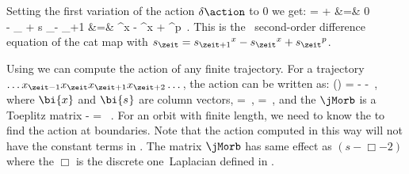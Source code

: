 Setting the first variation of the action $\delta \action$ to 0 we get:
\bea
\frac{\partial \action}{\partial \ssp_\zeit} =
 +  &=& 0 \\
\Rightarrow  - \ssp_{} + s \ssp_\zeit - \ssp_{\zeit+1}
&=& ^x - \Ssym{\zeit}^x + \Ssym{\zeit}^p
\,.
\label{ActVariantion}
\eea
This is the \PV\ second-order difference equation of the cat map with
$\Ssym{\zeit} = \Ssym{\zeit+1}^x - \Ssym{\zeit}^x + \Ssym{\zeit}^p$.

Using  we can compute the action of
any finite trajectory. For a trajectory $\dots \ssp_{\zeit-1}
\ssp_{\zeit} \ssp_{\zeit+1} \ssp_{\zeit+2} \dots$, the action can be
written as:
\beq
\action() = - \transp{\bi{\ssp}}\jMorb\bi{\ssp} - \transp{\bi{\Ssym{}}} \bi{\ssp}
\,,
where $\bi{\ssp}$ and $\bi{\Ssym{}}$ are column vectors,
\bea
\bi{\ssp}
=
\,,
\quad
\bi{\Ssym{}}
=
\,,
\label{eq:VectorFieldSourceNonPeriodic}
\eea
and the {\jacobianOrb} $\jMorb$ is a Toeplitz matrix
\bea
-\jMorb
=
 \, .
\label{jMorbInfin}
\eea
For an orbit with finite length, we need to know the {\bcs}
to find the action at boundaries. Note that the action computed in this
way will not have the constant terms in . The
matrix $\jMorb$ has same effect as $(s-\Box -2)$ where the $\Box$ is the
discrete one\dmn\ Laplacian defined in .


